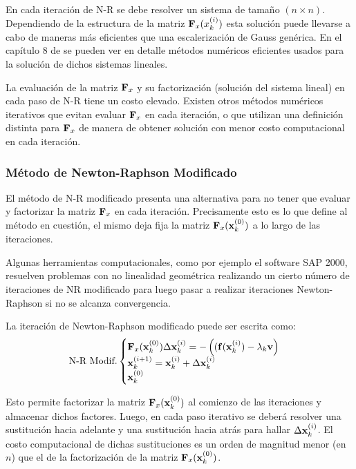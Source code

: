 En cada iteración de N-R se debe resolver un sistema de tamaño $(n \times n)$. Dependiendo de la estructura de la matriz ${\bf F}_x(x_k^{(i)})$ esta solución puede llevarse a cabo de maneras más eficientes que una escalerización de Gauss genérica. En el capítulo 8 de \citep{Bathe2014} se pueden ver en detalle métodos numéricos eficientes usados para la solución de dichos sistemas lineales.

La evaluación de la matriz ${\bf F}_x$ y su factorización (solución del sistema lineal) en cada paso de N-R tiene un costo elevado. Existen otros métodos numéricos iterativos que evitan evaluar ${\bf F}_x$ en cada iteración, o que utilizan una definición distinta para ${\bf F}_x$ de manera de obtener solución con menor costo computacional en cada iteración.

\subsubsection{Método de Newton-Raphson Modificado}

El método de N-R modificado presenta una alternativa para no tener que evaluar y factorizar la matriz ${\bf F}_x$ en cada iteración. Precisamente esto es lo que define al método en cuestión, el mismo deja fija la matriz ${\bf F}_x({\bf x}_k^{(0)})$ a lo largo de las iteraciones.

Algunas herramientas computacionales, como por ejemplo el software SAP 2000\textsuperscript{\textregistered}, resuelven problemas con no linealidad geométrica realizando un cierto número de iteraciones de NR modificado para luego pasar a realizar iteraciones Newton-Raphson si no se alcanza convergencia.

La iteración de Newton-Raphson modificado puede ser escrita como:
%
\begin{equation}\label{NRM}
\text{N-R Modif.}
\begin{cases} 
{\bf F}_x({\bf x}_k^{(0)})\Delta {\bf x}_k^{(i)} =-\left(({\bf f}({\bf x}_k^{(i)})-\lambda_k {\bf v}\right)\\
{\bf x}_k^{(i+1)}={\bf x}_k^{(i)}+\Delta {\bf x}_k^{(i)} \\
{\bf x}_k^{(0)}
\end{cases}
\end{equation}

Esto permite factorizar la matriz ${\bf F}_x({\bf x}_k^{(0)})$ al comienzo de las iteraciones y almacenar dichos factores. Luego, en cada paso iterativo se deberá resolver una sustitución hacia adelante y una sustitución hacia atrás para hallar $\Delta {\bf x}_k^{(i)}$. El costo computacional de dichas sustituciones es un orden de magnitud menor (en $n$) que el de la factorización de la matriz ${\bf F}_x({\bf x}_k^{(0)})$.

